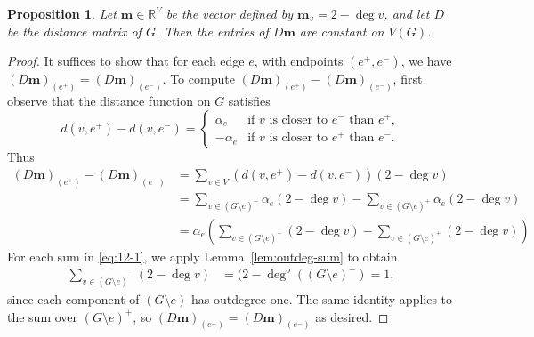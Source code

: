 \documentclass{amsart}
\newtheorem{prop}[thm]{Proposition}
\theoremstyle{definition}
\newcommand{\RR}{\mathbb{R}}
\newcommand{\bolddelta}{\bm{\delta}}
\newcommand{\boldm}{\mathbf{m}}
\newcommand{\degout}{\deg^o}
\begin{document}

\begin{prop}
\label{prop:m-distance-warmup}
Let $\boldm \in \RR^V$ be the vector defined by $\boldm_v = 2 - \deg v$,
and let $D$ be the distance matrix of $G$.
Then the entries of $D \boldm$
are constant on $V(G)$.
\end{prop}
\begin{proof}
It suffices to show that for each edge $e$, with endpoints $(e^+,e^-)$, we have
$
	(D \boldm)_{(e^+)} = (D \boldm)_{(e^-)} .
$
To compute $(D \boldm)_{(e^+)} - (D \boldm)_{(e^-)}$, first observe that the distance function on $G$ satisfies
\[
	d(v,e^+) - d(v,e^-) = \begin{cases}
	\alpha_e &\text{if $v$ is closer to $e^-$ than }e^+,\\
	- \alpha_e &\text{if $v$ is closer to $e^+$ than }e^-.
	\end{cases}
\]
Thus
\begin{align}
	(D \boldm)_{(e^+)} - (D \boldm)_{(e^-)} &= \sum_{v \in V} (d(v,e^+) - d(v,e^-)) (2 - \deg v) \\
	&= \sum_{v\in (G\setminus e)^-}  \alpha_e (2 - \deg v)  - \sum_{v\in (G\setminus e)^+} \alpha_e (2 - \deg v) \\
	&= \alpha_e \left( \sum_{v\in (G\setminus e)^-}  (2 - \deg v)  - \sum_{v\in (G\setminus e)^+} (2 - \deg v)\right) 
\label{eq:12-1}
\end{align}
For each sum in \eqref{eq:12-1}, we apply Lemma~\ref{lem:outdeg-sum} to obtain
\begin{align}
\sum_{v \in (G\setminus e)^-}  (2 - \deg v) &= (2 - \degout( (G\setminus e)^-) 
= 1 ,
\end{align}
since each component of $(G \setminus e)$ has outdegree one.
The same identity applies to the sum over $(G \setminus e)^+$, so $(D\boldm)_{(e^+)} = (D\boldm)_{(e^-)}$ as desired.
\end{proof}
\end{document}

